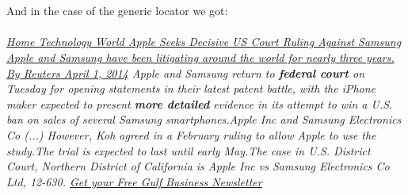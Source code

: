 \\\\
And in the case of the generic locator we got: 
\\\\
\emph{\ul{Home \/ Technology \/ World Apple Seeks Decisive US Court Ruling Against Samsung Apple and Samsung have been litigating around the world for nearly three years. By Reuters April 1, 2014} Apple and Samsung return to \textbf{federal court} on Tuesday for opening statements in their latest patent battle, with the iPhone maker expected to present \textbf{more detailed} evidence in its attempt to win a U.S. ban on sales of several Samsung smartphones.Apple Inc and Samsung Electronics Co  (...)
However, Koh agreed in a February ruling to allow Apple to use the study.The trial is expected to last until early May.The case in U.S. District Court, Northern District of California is Apple Inc vs Samsung Electronics Co Ltd, 12-630. \ul{Get your Free Gulf Business Newsletter}}
